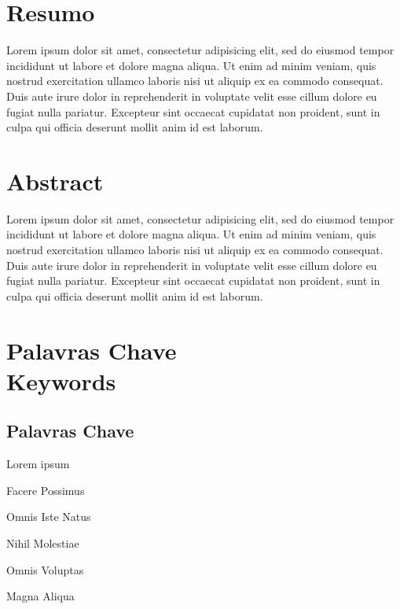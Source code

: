 \cleardoublepage


\chapter*{Resumo}
\thispagestyle{empty}

Lorem ipsum dolor sit amet, consectetur adipisicing elit, sed do eiusmod tempor incididunt ut labore et dolore magna aliqua. Ut enim ad minim veniam, quis nostrud exercitation ullamco laboris nisi ut aliquip ex ea commodo consequat. Duis aute irure dolor in reprehenderit in voluptate velit esse cillum dolore eu fugiat nulla pariatur. Excepteur sint occaecat cupidatat non proident, sunt in culpa qui officia deserunt mollit anim id est laborum.

\newpage


\chapter*{Abstract}
\thispagestyle{empty}

Lorem ipsum dolor sit amet, consectetur adipisicing elit, sed do eiusmod tempor incididunt ut labore et dolore magna aliqua. Ut enim ad minim veniam, quis nostrud exercitation ullamco laboris nisi ut aliquip ex ea commodo consequat. Duis aute irure dolor in reprehenderit in voluptate velit esse cillum dolore eu fugiat nulla pariatur. Excepteur sint occaecat cupidatat non proident, sunt in culpa qui officia deserunt mollit anim id est laborum.

\newpage


\chapter*{Palavras Chave \\ Keywords}
\thispagestyle{empty}

\section*{Palavras Chave}
{\large %

\noindent Lorem ipsum

\noindent Facere Possimus

\noindent Omnis Iste Natus

\noindent Nihil Molestiae

\noindent Omnis Voluptas

\noindent Magna Aliqua

}

